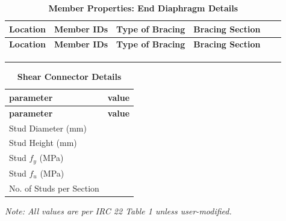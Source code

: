 \documentclass[12pt,a4paper]{report}
\numberwithin{table}{chapter}
\numberwithin{figure}{chapter}
\newcommand{\reportrowpad}{4pt}
\newcommand{\reportsmallgap}{0.4em}
\newcommand{\reportlargegap}{2.2em}
\newcommand{\reporttabcolsep}{3pt}
\begin{document}
\vspace{\reportsmallgap}
\noindent
\setlength{\tabcolsep}{\reporttabcolsep}
\setlength\LTleft{0pt}
\setlength\LTright{\fill}

\begin{longtable}{|L{2.2cm}|L{2.2cm}|L{3.0cm}|L{2.5cm}|C{1.8cm}|C{1.8cm}|}
\caption{\textbf{Member Properties: End Diaphragm Details}}\\
\hline
\textbf{Location} & \textbf{Member IDs} & \textbf{Type of Bracing} & \textbf{Bracing Section} \\
\hline
\endfirsthead
\hline
\textbf{Location} & \textbf{Member IDs} & \textbf{Type of Bracing} & \textbf{Bracing Section} \\
\hline
\endhead
 &  &  &  \\[\reportrowpad]
\hline
 &  &  &  \\[\reportrowpad]
\hline
 &  &  &  \\[\reportrowpad]
\hline
\end{longtable}



\label{subsec:shear-connectors}

\vspace{\reportlargegap}

\vspace{\reportsmallgap}
\begin{longtable}{|L{5.5cm}|p{10.0cm}|}
\caption{\textbf{Shear Connector Details}}\\
\hline
\textbf{parameter} & \textbf{value} \\
\hline
\endfirsthead
\hline
\textbf{parameter} & \textbf{value} \\
\hline
\endhead
\textnormal{Stud Diameter (mm)} &  \\[\reportrowpad]
\hline
\textnormal{Stud Height (mm)} &  \\[\reportrowpad]
\hline
\textnormal{Stud $f_y$ (MPa)} &  \\[\reportrowpad]
\hline
\textnormal{Stud $f_u$ (MPa)} &  \\[\reportrowpad]
\hline
\textnormal{No. of Studs per Section} &  \\[\reportrowpad]
\hline
\end{longtable}



\label{subsec:safety-factors}

\vspace{\reportlargegap}

\vspace{0.3em}
\noindent\textit{Note: All values are per IRC 22 Table 1 unless user-modified.}
\end{document}
